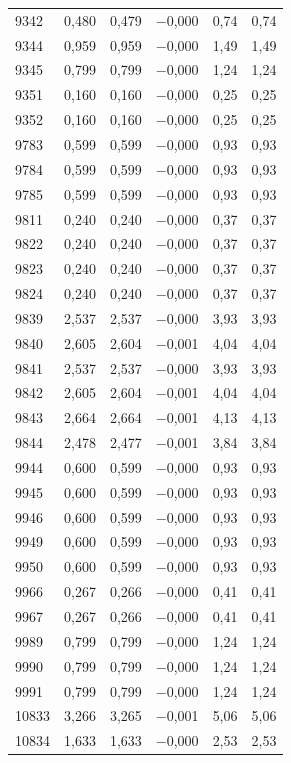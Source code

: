 \begin{longtable}{lccccc}
9342 & 0,480 & 0,479 & $-$0,000 & 0,74 & 0,74 \\
9344 & 0,959 & 0,959 & $-$0,000 & 1,49 & 1,49 \\
9345 & 0,799 & 0,799 & $-$0,000 & 1,24 & 1,24 \\
9351 & 0,160 & 0,160 & $-$0,000 & 0,25 & 0,25 \\
9352 & 0,160 & 0,160 & $-$0,000 & 0,25 & 0,25 \\
9783 & 0,599 & 0,599 & $-$0,000 & 0,93 & 0,93 \\
9784 & 0,599 & 0,599 & $-$0,000 & 0,93 & 0,93 \\
9785 & 0,599 & 0,599 & $-$0,000 & 0,93 & 0,93 \\
9811 & 0,240 & 0,240 & $-$0,000 & 0,37 & 0,37 \\
9822 & 0,240 & 0,240 & $-$0,000 & 0,37 & 0,37 \\
9823 & 0,240 & 0,240 & $-$0,000 & 0,37 & 0,37 \\
9824 & 0,240 & 0,240 & $-$0,000 & 0,37 & 0,37 \\
9839 & 2,537 & 2,537 & $-$0,000 & 3,93 & 3,93 \\
9840 & 2,605 & 2,604 & $-$0,001 & 4,04 & 4,04 \\
9841 & 2,537 & 2,537 & $-$0,000 & 3,93 & 3,93 \\
9842 & 2,605 & 2,604 & $-$0,001 & 4,04 & 4,04 \\
9843 & 2,664 & 2,664 & $-$0,001 & 4,13 & 4,13 \\
9844 & 2,478 & 2,477 & $-$0,001 & 3,84 & 3,84 \\
9944 & 0,600 & 0,599 & $-$0,000 & 0,93 & 0,93 \\
9945 & 0,600 & 0,599 & $-$0,000 & 0,93 & 0,93 \\
9946 & 0,600 & 0,599 & $-$0,000 & 0,93 & 0,93 \\
9949 & 0,600 & 0,599 & $-$0,000 & 0,93 & 0,93 \\
9950 & 0,600 & 0,599 & $-$0,000 & 0,93 & 0,93 \\
9966 & 0,267 & 0,266 & $-$0,000 & 0,41 & 0,41 \\
9967 & 0,267 & 0,266 & $-$0,000 & 0,41 & 0,41 \\
9989 & 0,799 & 0,799 & $-$0,000 & 1,24 & 1,24 \\
9990 & 0,799 & 0,799 & $-$0,000 & 1,24 & 1,24 \\
9991 & 0,799 & 0,799 & $-$0,000 & 1,24 & 1,24 \\
10833 & 3,266 & 3,265 & $-$0,001 & 5,06 & 5,06 \\
10834 & 1,633 & 1,633 & $-$0,000 & 2,53 & 2,53 \\

\end{longtable}
